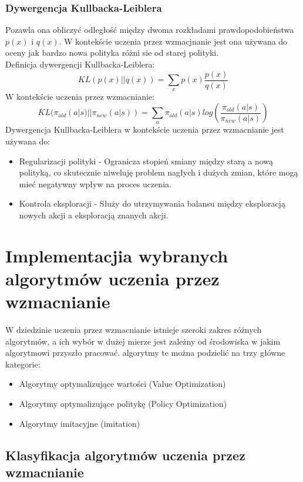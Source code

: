 \documentclass[a4paper, 12pt]{article}
\begin{document}
    \subsubsection{Dywergencja Kullbacka-Leiblera}
    Pozawla ona obliczyć odległość między dwoma rozkładami prawdopodobieństwa \( p(x) \) i \( q(x) \). W kontekście uczenia przez wzmacjnanie jest ona używana
    do oceny jak bardzo nowa polityka różni sie od starej polityki. 
    \\ Definicja dywergencji Kullbacka-Leiblera:
    \[ KL(p(x) || q(x)) = \sum_{x} p(x) \frac{p(x)}{q(x)}\]
    W kontekście uczenia przez wzmacnianie:
    \[ KL(\pi_{old}(a|s) || \pi_{new}(a|s)) = \sum_{a} \pi_{old}(a|s) log(\frac{\pi_{old}(a|s)}{\pi_{new}(a|s)})\]
    Dywergencja Kullbacka-Leiblera w kontekście uczenia przez wzmacnianie jest używana do:
    \begin{itemize}
        \item Regularizacji polityki - Ogranicza stopień smiany między starą a nową polityką, co skutecznie niweluję problem nagłych i dużych zmian,
        które mogą mieć negatywny wpływ na proces uczenia.
        \item Kontrola eksploracji - Służy do utrzymywania balansu między eksploracją nowych akcji a eksploracją znanych akcji.
    \end{itemize}
    \section{Implementacjia wybranych algorytmów uczenia przez wzmacnianie}
    W dziedzinie uczenia przez wzmacnianie istnieje szeroki zakres różnych algorytmów, a ich wybór w dużej mierze
    jest zależny od środowiska w jakim algorytmowi przyszło pracować. algorytmy te można podzielić na trzy główne kategorie:
    \begin{itemize}
        \item Algorytmy optymalizujące wartości (Value Optimization)
        \item Algorytmy optymalizujące politykę (Policy Optimization)
        \item Algorytmy imitacyjne (imitation)
    \end{itemize}
    \subsection{Klasyfikacja algorytmów uczenia przez wzmacnianie}
\end{document}
